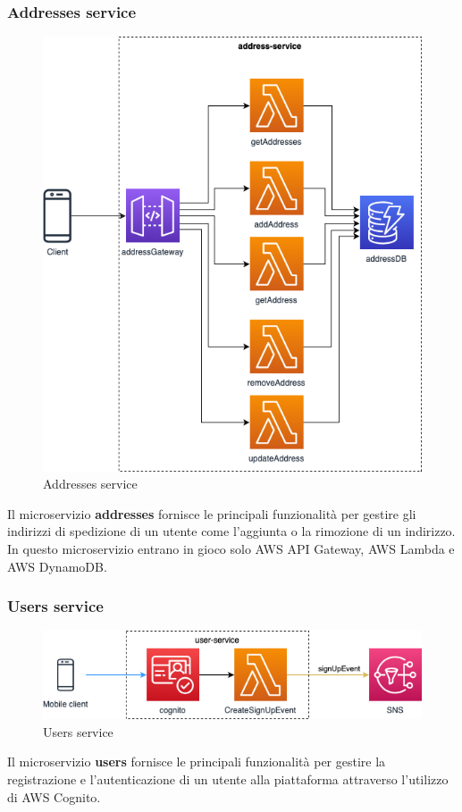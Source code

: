 \subsubsection{Addresses service}
\begin{figure}[H]
	\centering
	\includegraphics[scale=0.4]{Immagini/Backend/AWSAddresses.png}
	\caption{Addresses service}
	\label{fig:Adresses}
\end{figure}
Il microservizio \textbf{addresses} fornisce le principali funzionalità per gestire gli indirizzi di spedizione di un utente come l'aggiunta o la rimozione di un indirizzo. In questo microservizio entrano in gioco solo AWS API Gateway, AWS Lambda e AWS DynamoDB.

\subsubsection{Users service}
\begin{figure}[H]
	\centering
	\includegraphics[scale=0.7]{Immagini/Backend/AWSUserService.png}
	\caption{Users service}
	\label{fig:Users}
\end{figure} 
Il microservizio \textbf{users} fornisce le principali funzionalità per gestire la registrazione e l'autenticazione di un utente alla piattaforma attraverso l'utilizzo di AWS Cognito.

